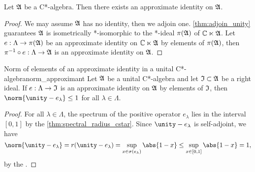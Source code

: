 \begin{corollary}
    Let \(\mathfrak{A}\) be a C*-algebra. Then there exists an approximate identity on \(\mathfrak{A}\).
\end{corollary}
\begin{proof}
    We may assume \(\mathfrak{A}\) has no identity, then we adjoin one. \cref{thm:adjoin_unity} guarantees \(\mathfrak{A}\) is isometrically *-isomorphic to the *-ideal \(\pi(\mathfrak{A})\) of \(\mathbb{C} \ltimes \mathfrak{A}\). Let \(e : \Lambda \to \pi(\mathfrak{A})\) be an approximate identity on \(\mathbb{C} \ltimes \mathfrak{A}\) by elements of \(\pi(\mathfrak{A})\), then \(\pi^{-1} \circ e : \Lambda \to \mathfrak{A}\) is an approximate identity on \(\mathfrak{A}\).
\end{proof}

\begin{lemma}{Norm of elements of an approximate identity in a unital C*-algebra}{norm_approximant}
    Let \(\mathfrak{A}\) be a unital C*-algebra and let \(\mathfrak{I} \subset \mathfrak{A}\) be a right ideal. If \(e : \Lambda \to \mathfrak{I}\) is an approximate identity on \(\mathfrak{A}\) by elements of \(\mathfrak{I}\), then \(\norm{\unity - e_{\lambda}} \leq 1\) for all \(\lambda \in \Lambda\).
\end{lemma}
\begin{proof}
    For all \(\lambda \in \Lambda\), the spectrum of the positive operator \(e_{\lambda}\) lies in the interval \([0,1]\) by the \cref{thm:spectral_radius_cstar}. Since \(\unity - e_{\lambda}\) is self-adjoint, we have
    \begin{equation*}
        \norm{\unity - e_{\lambda}} = r(\unity - e_{\lambda}) = \sup_{x \in \sigma(e_{\lambda})}{\abs{1 - x}} \leq \sup_{x \in [0,1]}{\abs{1 - x}} = 1,
    \end{equation*}
    by the .
\end{proof}

